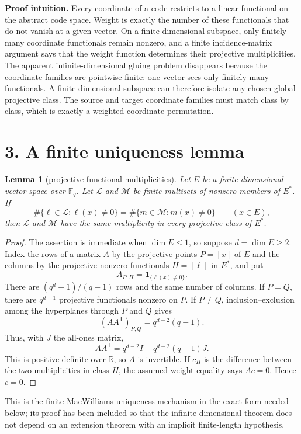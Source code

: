 \documentclass[11pt]{article}
\newtheorem{lemma}[theorem]{Lemma}
\newcommand{\F}{\mathbb F}
\begin{document}
\textbf{Proof intuition.}
Every coordinate of a code restricts to a linear functional on the abstract
code space.  Weight is exactly the number of these functionals that do not
vanish at a given vector.  On a finite-dimensional subspace, only finitely
many coordinate functionals remain nonzero, and a finite incidence-matrix
argument says that the weight function determines their projective
multiplicities.  The apparent infinite-dimensional gluing problem disappears
because the coordinate families are pointwise finite: one vector sees only
finitely many functionals.  A finite-dimensional subspace can therefore
isolate any chosen global projective class.  The source and target coordinate
families must match class by class, which is exactly a weighted coordinate
permutation.

\section*{3. A finite uniqueness lemma}

\begin{lemma}[projective functional multiplicities]\label{lem:finite}
Let $E$ be a finite-dimensional vector space over $\F_q$.  Let
$\mathcal L$ and $\mathcal M$ be finite multisets of nonzero members of $E^*$.
If
\[
 \#\{\ell\in\mathcal L:\ell(x)\ne0\}
 =\#\{m\in\mathcal M:m(x)\ne0\}
 \qquad(x\in E),
\]
then $\mathcal L$ and $\mathcal M$ have the same multiplicity in every
projective class of $E^*$.
\end{lemma}

\begin{proof}
The assertion is immediate when $\dim E\leq1$, so suppose $d=\dim E\geq2$.
Index the rows of a matrix $A$ by the projective points $P=[x]$ of $E$ and the
columns by the projective nonzero functionals $H=[\ell]$ in $E^*$, and put
\[
 A_{P,H}=\mathbf 1_{\{\ell(x)\ne0\}}.
\]
There are $(q^d-1)/(q-1)$ rows and the same number of columns.  If $P=Q$,
there are $q^{d-1}$ projective functionals nonzero on $P$.  If $P\ne Q$,
inclusion--exclusion among the hyperplanes through $P$ and $Q$ gives
\[
 (AA^{\mathsf T})_{P,Q}=q^{d-2}(q-1).
\]
Thus, with $J$ the all-ones matrix,
\[
 AA^{\mathsf T}
 =q^{d-2}I+q^{d-2}(q-1)J.
\]
This is positive definite over $\mathbb R$, so $A$ is invertible.  If $c_H$
is the difference between the two multiplicities in class $H$, the assumed
weight equality says $Ac=0$.  Hence $c=0$.
\end{proof}

This is the finite MacWilliams uniqueness mechanism in the exact form needed
below; its proof has been included so that the infinite-dimensional theorem
does not depend on an extension theorem with an implicit finite-length
hypothesis.
\end{document}

